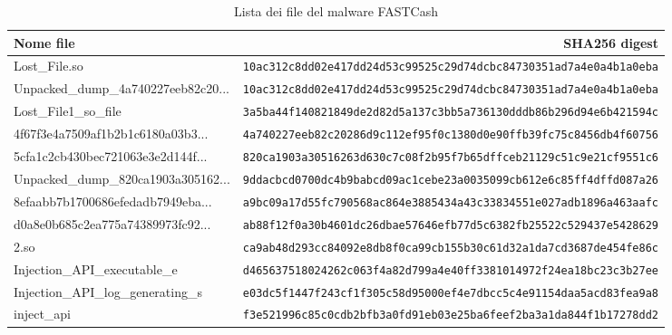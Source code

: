 \documentclass[10pt,a4paper, titlepage]{report}
\begin{document}
\begin{table}[h!]
 
    \caption{Lista dei file del malware FASTCash}
    \centering
    \small
    \label{tab:MalwareFileList}
    
    \begin{adjustbox}{center=\textwidth}
 
     \begin{tabular}{l|r}
      \toprule
      \textbf{Nome file} & \textbf{SHA256 digest} \\
      \midrule
      
      Lost\_File.so & \texttt{10ac312c8dd02e417dd24d53c99525c29d74dcbc84730351ad7a4e0a4b1a0eba} \\
      \hline
      Unpacked\_dump\_4a740227eeb82c20... & \texttt{10ac312c8dd02e417dd24d53c99525c29d74dcbc84730351ad7a4e0a4b1a0eba} \\
  \hline
  Lost\_File1\_so\_file & \texttt{3a5ba44f140821849de2d82d5a137c3bb5a736130dddb86b296d94e6b421594c} \\
    \hline
      4f67f3e4a7509af1b2b1c6180a03b3... & \texttt{4a740227eeb82c20286d9c112ef95f0c1380d0e90ffb39fc75c8456db4f60756} \\ 
      \hline
      5cfa1c2cb430bec721063e3e2d144f... & \texttt{820ca1903a30516263d630c7c08f2b95f7b65dffceb21129c51c9e21cf9551c6} \\
      \hline
      Unpacked\_dump\_820ca1903a305162... & \texttt{9ddacbcd0700dc4b9babcd09ac1cebe23a0035099cb612e6c85ff4dffd087a26} \\
      \hline
      8efaabb7b1700686efedadb7949eba... & \texttt{a9bc09a17d55fc790568ac864e3885434a43c33834551e027adb1896a463aafc} \\
      \hline
      d0a8e0b685c2ea775a74389973fc92... & \texttt{ab88f12f0a30b4601dc26dbae57646efb77d5c6382fb25522c529437e5428629} \\
      \hline
      2.so & \texttt{ca9ab48d293cc84092e8db8f0ca99cb155b30c61d32a1da7cd3687de454fe86c} \\
      \hline
      Injection\_API\_executable\_e & \texttt{d465637518024262c063f4a82d799a4e40ff3381014972f24ea18bc23c3b27ee}\\
      \hline
      Injection\_API\_log\_generating\_s & \texttt{e03dc5f1447f243cf1f305c58d95000ef4e7dbcc5c4e91154daa5acd83fea9a8}\\
      \hline
      inject\_api & \texttt{f3e521996c85c0cdb2bfb3a0fd91eb03e25ba6feef2ba3a1da844f1b17278dd2}\\
      
      \bottomrule
    \end{tabular}
    \end{adjustbox}
  
\end{table}
\end{document}

